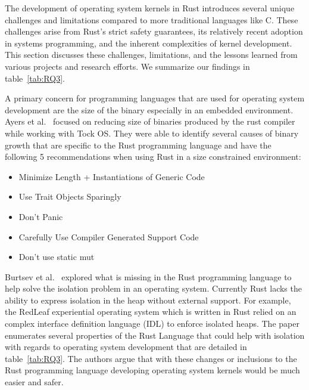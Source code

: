 \documentclass[sigconf,review,anonymous]{acmart}
\begin{document}
The development of operating system kernels in Rust introduces several unique challenges and
limitations compared to more traditional languages like C. These challenges arise from Rust’s strict
safety guarantees, its relatively recent adoption in systems programming, and the inherent
complexities of kernel development. This section discusses these challenges, limitations, and the
lessons learned from various projects and research efforts.  We summarize our findings in
table~\ref{tab:RQ3}.

A primary concern for programming languages that are used for operating system development are the
size of the binary especially in an embedded environment.  Ayers et al.~\cite{Ayers2022-sf} focused
on reducing size of binaries produced by the rust compiler while working with Tock OS. They were
able to identify several  causes of binary growth that are specific to the Rust programming language
and have the following 5 recommendations when using Rust in a size constrained environment:
\begin{itemize}
  \item Minimize Length + Instantiations of Generic Code
  \item Use Trait Objects Sparingly
  \item Don't Panic
  \item Carefully Use Compiler Generated Support Code
  \item Don't use static mut
\end{itemize}

Burtsev et al.~\cite{Burtsev2021-mh} explored what is missing in the Rust programming language to
help solve the isolation problem in an operating system. Currently Rust lacks the ability to express
isolation in the heap without external support. For example, the RedLeaf experiential operating
system which is written in Rust relied on an complex interface definition language (IDL) to enforce
isolated heaps. The paper enumerates several properties of the Rust Language that could help with
isolation with regards to operating system development that are detailed in table~\ref{tab:RQ3}. The
authors argue that with these changes or inclusions to the Rust programming language developing
operating system kernels would be much easier and safer.
\end{document}
